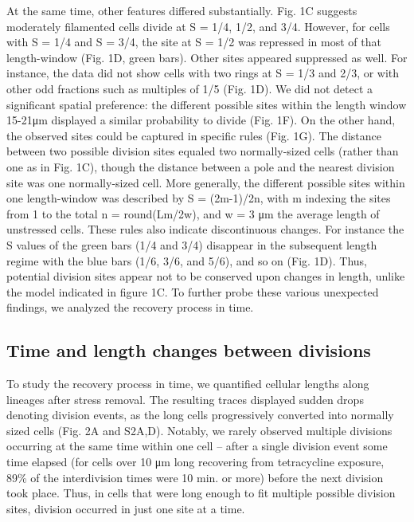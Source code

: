 At the same time, other features differed substantially. Fig. 1C suggests moderately filamented cells divide at S = 1/4,  1/2, and 3/4. However, for cells with S = 1/4 and S = 3/4, the site at S = 1/2 was repressed in most of that length-window (Fig. 1D, green bars). Other sites appeared suppressed as well. For instance, the data did not show cells with two rings at S = 1/3 and 2/3, or with other odd fractions such as multiples of 1/5 (Fig. 1D). We did not detect a significant spatial preference: the different possible sites within the length window 15-21μm displayed a similar probability to divide (Fig. 1F). On the other hand, the observed sites could be captured in specific rules (Fig. 1G). The distance between two possible division sites equaled two normally-sized cells (rather than one as in Fig. 1C), though the distance between a pole and the nearest division site was one normally-sized cell. More generally, the different possible sites within one length-window was described by S = (2m-1)/2n, with m indexing the sites from 1 to the total n = round(Lm/2w), and w = 3 μm the average length of unstressed cells. These rules also indicate discontinuous changes. For instance the S values of the green bars (1/4 and 3/4) disappear in the subsequent length regime with the blue bars (1/6, 3/6, and 5/6), and so on (Fig. 1D). Thus, potential division sites appear not to be conserved upon changes in length, unlike the model indicated in figure 1C. To further probe these various unexpected findings, we analyzed the recovery process in time. 

\subsection{Time and length changes between divisions}
To study the recovery process in time, we quantified cellular lengths along lineages after stress removal. The resulting traces displayed sudden drops denoting division events, as the long cells progressively converted into normally sized cells (Fig. 2A and S2A,D). Notably, we rarely observed multiple divisions occurring at the same time within one cell – after a single division event some time elapsed (for cells over 10 μm long recovering from tetracycline exposure, 89\% of the interdivision times were 10 min. or more) before the next division took place.  Thus, in cells that were long enough to fit multiple possible division sites, division occurred in just one site at a time.

